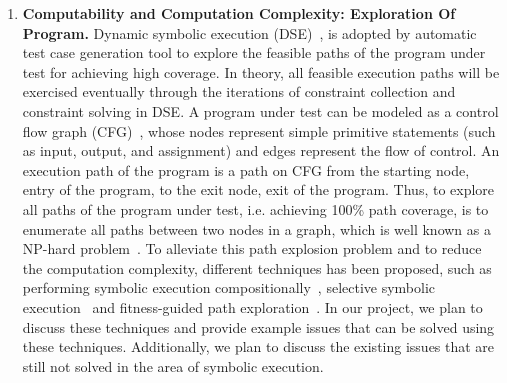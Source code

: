 \documentclass[times, 10pt,onecolumn]{article}
\begin{document}
\begin{enumerate}
\item{\textbf{Computability and Computation Complexity: Exploration Of Program.} Dynamic symbolic execution (DSE)~\cite{dart,exe,cute}, is adopted by automatic test case generation tool to explore the feasible paths of the program under test for achieving high coverage. In theory, all feasible execution paths will be exercised eventually through the iterations of constraint collection and constraint solving in DSE. A program under test can be modeled as a control flow graph (CFG)~\cite{testbook}, whose nodes represent simple primitive statements (such as input, output, and assignment) and edges represent the flow of control. An execution path of the program is a path on CFG from the starting node, entry of the program, to the exit node, exit of the program. Thus, to explore all paths of the program under test, i.e. achieving 100\% path coverage, is to enumerate all paths between two nodes in a graph, which is well known as a NP-hard problem~\cite{graph}. To alleviate this path explosion problem and to reduce the computation complexity, different techniques has been proposed, such as performing symbolic execution compositionally~\cite{compositional}, selective symbolic execution~\cite{selective} and fitness-guided path exploration~\cite{fitness}. In our project, we plan to discuss these techniques and provide example issues that can be solved using these techniques. Additionally, we plan to discuss the existing issues that are still not solved in the area of symbolic execution.}
\end{enumerate}



\end{document}
